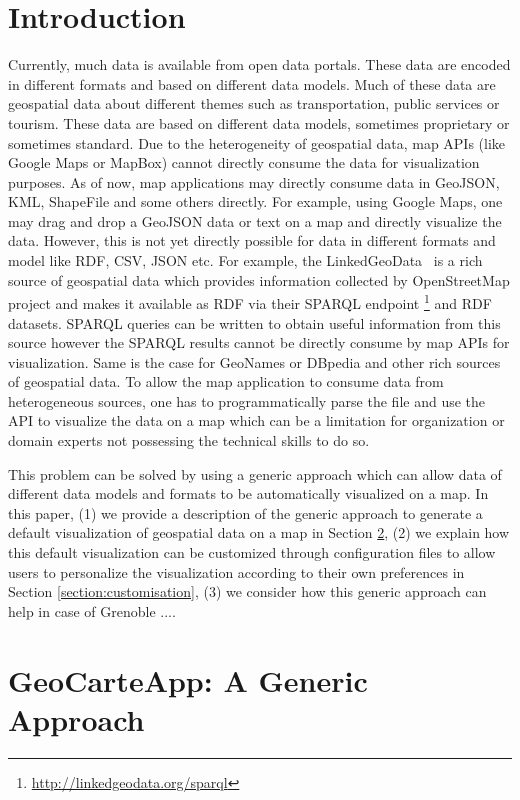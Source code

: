 \documentclass[a4paper,pagenum,english]{rnti}
\affiliation{
    \affil{1}Univ Lyon, MINES Saint-\'Etienne, CNRS, Laboratoire Hubert Curien UMR 5516, \\F-42023 Saint-\'Etienne, France\\
          \{prenom.nom\}@emse.fr\\
    \affil{2}Mondeca, \\ 35 boulevard Strasbourg, Paris, France\\
          ghislain.atemezing@mondeca.com\\
 }
\begin{document}
\section{Introduction}
Currently, much data is available from open data portals. These data are encoded in different formats and based on different data models. Much of these data are geospatial data about different themes such as transportation, public services or tourism. These data are based on different data models, sometimes proprietary or sometimes standard. Due to the heterogeneity of geospatial data, map APIs (like Google Maps or MapBox) cannot directly consume the data for visualization purposes. As of now, map applications may directly consume data in GeoJSON, KML, ShapeFile and some others directly. For example, using Google Maps, one may drag and drop a GeoJSON data or text on a map and directly visualize the data. However, this is not yet directly possible for data in different formats and model like RDF, CSV, JSON etc. For example, the LinkedGeoData~\cite{stadler2012linkedgeodata} is a rich source of geospatial data which provides information collected by OpenStreetMap project and makes it available as RDF via their SPARQL endpoint \footnote{\url{http://linkedgeodata.org/sparql}} and RDF datasets. SPARQL queries can be written to obtain useful information from this source however the SPARQL results cannot be directly consume by map APIs for visualization. Same is the case for GeoNames or DBpedia and other rich sources of geospatial data. To allow the map application to consume data from heterogeneous sources, one has to programmatically parse the file and use the API to visualize the data on a map which can be a limitation for organization or domain experts not possessing the technical skills to do so.

This problem can be solved by using a generic approach which can allow data of different data models and formats to be automatically visualized on a map. In this paper, (1) we provide a description of the generic approach to generate a default visualization of geospatial data on a map in Section \ref{section:generic}, (2) we explain how this default visualization can be customized through configuration files to allow users to personalize the visualization according to their own preferences in Section \ref{section:customisation}, (3) we consider how this generic approach can help in case of Grenoble ....
\section{GeoCarteApp: A Generic Approach}\label{section:generic}
\end{document}

